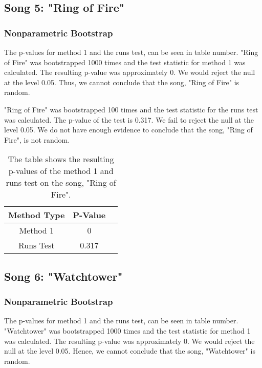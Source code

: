 \documentclass[12pt, letterpaper]{article}
\begin{document}
\subsection{Song 5: "Ring of Fire"}

\subsubsection{Nonparametric Bootstrap}
The p-values for method 1 and the runs test, can be seen in table number. "Ring of Fire" was bootstrapped 1000 times and the test statistic for method 1 was calculated. The resulting p-value was approximately 0. We would reject the null at the level 0.05. Thus, we cannot conclude that the song, "Ring of Fire" is random. 

"Ring of Fire" was bootstrapped 100 times and the test statistic for the runs test was calculated. The p-value of the test is 0.317. We fail to reject the null at the level 0.05. We do not have enough evidence to conclude that the song, "Ring of Fire", is not random.
\begin{table}[h]
\begin{center}
\begin{tabular}{|c|c|c|}
\hline
\textbf{Method Type} & P-Value \\
\hline
Method 1 & 0  \\
\hline
Runs Test & 0.317 \\ 
\hline
\end{tabular}
\end{center}
\caption{The table shows the resulting p-values of the method 1 and runs test on the song, "Ring of Fire".}
\label{fig: P-values for "Ring of Fire"}
\end{table}

\subsection{Song 6: "Watchtower"}

\subsubsection{Nonparametric Bootstrap}
The p-values for method 1 and the runs test, can be seen in table number. "Watchtower" was bootstrapped 1000 times and the test statistic for method 1 was calculated. The resulting p-value was approximately 0. We would reject the null at the level 0.05. Hence, we cannot conclude that the song, "Watchtower" is random. 
\end{document}
